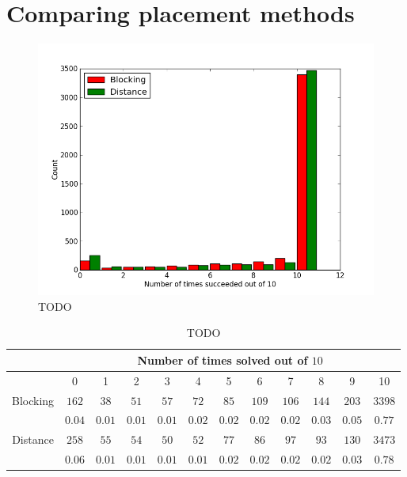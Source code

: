 \section{Comparing placement methods}

\begin{figure}
\begin{center}
\includegraphics[width=\textwidth]{Images/placement_success_comparison.png}
\caption{TODO}
\label{fig:placement_success}
\end{center}
\end{figure}

\begin{table}[H]
\begin{center}
\begin{singlespace}
\begin{tabular}{|c||c|c|c|c|c|c|c|c|c|c|c|}
\hline
 & \multicolumn{11}{|c|}{Number of times solved out of $10$} \\
\hline
 & 0 & 1 & 2 & 3 & 4 & 5 & 6 & 7 & 8 & 9 & 10 \\
\hline\hline
Blocking & $162$ & $38$ & $51$ & $57$ & $72$ & $85$ & $109$ & $106$ & $144$ & $203$ & $3398$ \\
 & $0.04$ & $0.01$ & $0.01$ & $0.01$ & $0.02$ & $0.02$ & $0.02$ & $0.02$ & $0.03$ & $0.05$ & $0.77$ \\
\hline
 Distance & $258$ & $55$ & $54$ & $50$ & $52$ & $77$ & $86$ & $97$ & $93$ & $130$ & $3473$ \\
  & $0.06$ & $0.01$ & $0.01$ & $0.01$ & $0.01$ & $0.02$ & $0.02$ & $0.02$ & $0.02$ & $0.03$ & $0.78$ \\
\hline
\end{tabular}
\end{singlespace}
\end{center}
\caption{TODO}
\end{table}

